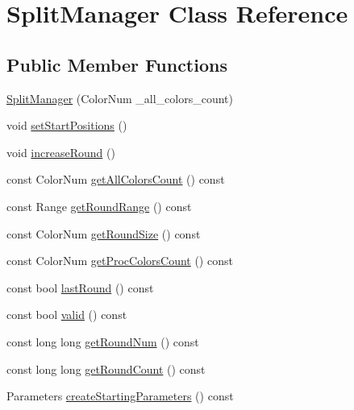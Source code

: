 \hypertarget{class_split_manager}{\section{Split\-Manager Class Reference}
\label{class_split_manager}
}
\subsection*{Public Member Functions}
\begin{DoxyCompactItemize}
\item 
\hyperlink{class_split_manager_a43be4ad8687d41b4d5b39930f5647fd3}{Split\-Manager} (Color\-Num \-\_\-all\-\_\-colors\-\_\-count)
\item 
void \hyperlink{class_split_manager_aefbe08dc3d1ffc189c71b16ef9d29a2c}{set\-Start\-Positions} ()
\item 
void \hyperlink{class_split_manager_a59d545f8e492f00c4dfc37ac5b2f5fa0}{increase\-Round} ()
\item 
const Color\-Num \hyperlink{class_split_manager_a29b0ff3eeafec41aa6e5a69598f53e0c}{get\-All\-Colors\-Count} () const 
\item 
const Range \hyperlink{class_split_manager_a22b8aa231bc5169b2239427fd6a65a50}{get\-Round\-Range} () const 
\item 
const Color\-Num \hyperlink{class_split_manager_a0201cbbb62e2e0a545ff14fd2ec3546e}{get\-Round\-Size} () const 
\item 
const Color\-Num \hyperlink{class_split_manager_a6a056c67fc1b475e6ad79a55965b981e}{get\-Proc\-Colors\-Count} () const 
\item 
const bool \hyperlink{class_split_manager_a4a1a01702396ccfd7e268eed9967eea1}{last\-Round} () const 
\item 
const bool \hyperlink{class_split_manager_a8aa618ec1490e8cea24ae1d9f91e9334}{valid} () const 
\item 
const long long \hyperlink{class_split_manager_aa6986e0b62d5cf945ad7fd07599f9b0c}{get\-Round\-Num} () const 
\item 
const long long \hyperlink{class_split_manager_a3b27f3ebeadde75b653ae682d42fad92}{get\-Round\-Count} () const 
\item 
Parameters \hyperlink{class_split_manager_ab27835493c0bd777569d8b1528667abf}{create\-Starting\-Parameters} () const 
\end{DoxyCompactItemize}


